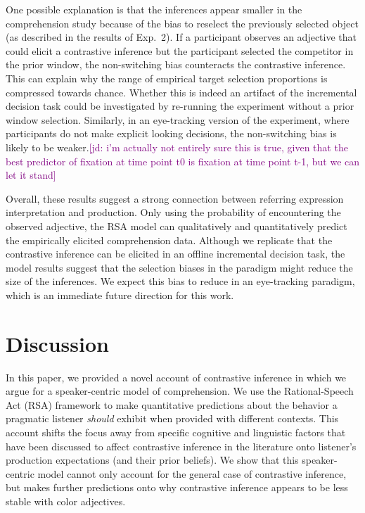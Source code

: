\documentclass[10pt,letterpaper]{article}
\newcommand{\ek}[1]{\textcolor{Orange}{[ek: #1]}}
\newcommand{\jd}[1]{\textcolor{Purple}{[jd: #1]}}
\begin{document}
One possible explanation is that the inferences appear smaller in the comprehension study because of the bias to reselect the previously selected object (as described in the results of Exp.~2). If a participant observes an adjective that could elicit a contrastive inference but the participant selected the competitor in the prior window, the non-switching bias counteracts the contrastive inference. This can explain why the range of empirical target selection proportions is compressed towards chance. Whether this is indeed an artifact of the incremental decision task could be investigated by re-running the experiment without a prior window selection. Similarly, in an eye-tracking version of the experiment, where participants do not make explicit looking decisions, the non-switching bias is likely to be weaker.\jd{i'm actually not entirely sure this is true, given that the best predictor of fixation at time point t0 is fixation at time point t-1, but we can let it stand}


Overall, these results suggest a strong connection between referring expression interpretation and production. Only using the probability of encountering the observed adjective, the RSA model can qualitatively and quantitatively predict the empirically elicited comprehension data. Although we replicate that the contrastive inference can be elicited in an offline incremental decision task, the model results suggest that the selection biases in the paradigm might reduce the size of the inferences. We expect this bias to reduce in an eye-tracking paradigm, which is an immediate future direction for this work.


\section{Discussion}

In this paper, we provided a novel account of contrastive inference in which we argue for a speaker-centric model of comprehension. We use the Rational-Speech Act (RSA) framework to make quantitative predictions about the behavior a pragmatic listener \textit{should} exhibit when provided with different contexts. This account shifts the focus away from specific cognitive and linguistic factors that have been discussed to affect contrastive inference in the literature onto listener's production expectations (and their prior beliefs). We show that this speaker-centric model cannot only account for the general case of contrastive inference, but makes further predictions onto why contrastive inference appears to be less stable with color adjectives. 
\end{document}
